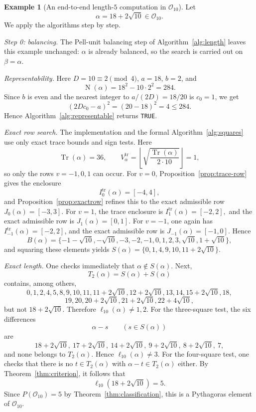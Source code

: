 \documentclass[manuscript,screen]{acmart}
\renewcommand{\le}{\leqslant}
\theoremstyle{plain}
\theoremstyle{definition}
\newtheorem{example}[theorem]{Example}
\theoremstyle{nonitalicremark}
\newcommand{\OO}{\mathcal{O}}
\newcommand{\len}{\ell}
\newcommand{\Tr}{\operatorname{Tr}}
\newcommand{\Norm}{\operatorname{N}}
\begin{document}
\begin{example}[An end-to-end length-$5$ computation in $\OO_{10}$]\label{ex:endtoend}
Let
\[
\alpha = 18 + 2\sqrt{10} \in \OO_{10}.
\]
We apply the algorithms step by step.

\noindent\emph{Step 0: balancing.} The Pell-unit balancing step of Algorithm~\ref{alg:length} leaves this example unchanged: $\alpha$ is already balanced, so the search is carried out on $\beta=\alpha$.

\noindent\emph{Representability.}
Here $D=10\equiv 2 \pmod 4$, $a=18$, $b=2$, and
\[
\Norm(\alpha)=18^2-10\cdot 2^2 = 284.
\]
Since $b$ is even and the nearest integer to $a/(2D)=18/20$ is $c_0=1$, we get
\[
(2Dc_0-a)^2 = (20-18)^2 = 4 \le 284.
\]
Hence Algorithm~\ref{alg:representable} returns \texttt{TRUE}.

\noindent\emph{Exact row search.}
The implementation and the formal Algorithm~\ref{alg:squares} use only exact trace bounds and
sign tests. Here
\[
\Tr(\alpha)=36,
\qquad
V_\alpha^{\mathrm{tr}}=\left\lfloor\sqrt{\frac{\Tr(\alpha)}{2\cdot 10}}\right\rfloor=1,
\]
so only the rows $v=-1,0,1$ can occur.
For $v=0$, Proposition~\ref{prop:trace-row} gives the enclosure
\[
I^{\mathrm{tr}}_0(\alpha)=[-4,4],
\]
and Proposition~\ref{prop:exactrow} refines this to the exact admissible row
\(
J_0(\alpha)=[-3,3].
\)
For $v=1$, the trace enclosure is
\(
I^{\mathrm{tr}}_1(\alpha)=[-2,2],
\)
and the exact admissible row is
\(
J_1(\alpha)=[0,1].
\)
For $v=-1$, one again has $I^{\mathrm{tr}}_{-1}(\alpha)=[-2,2]$, and the exact admissible row is
\(
J_{-1}(\alpha)=[-1,0].
\)
Hence
\[
B(\alpha)=\{-1-\sqrt{10},-\sqrt{10},-3,-2,-1,0,1,2,3,\sqrt{10},1+\sqrt{10}\},
\]
and squaring these elements yields
\(
S(\alpha)=\{0,1,4,9,10,11+2\sqrt{10}\}.
\)

\noindent\emph{Exact length.}
One checks immediately that $\alpha\notin S(\alpha)$. Next,
\[
T_2(\alpha)=S(\alpha)+S(\alpha)
\]
contains, among others,
\[
0,1,2,4,5,8,9,10,11,11+2\sqrt{10},12+2\sqrt{10},13,14,15+2\sqrt{10},18,
\]
\[
19,20,20+2\sqrt{10},21+2\sqrt{10},22+4\sqrt{10},
\]
but not $18+2\sqrt{10}$. Therefore $\len_{10}(\alpha)\neq 1,2$.
For the three-square test, the six differences
\[
\alpha-s \qquad (s\in S(\alpha))
\]
are
\[
18+2\sqrt{10},\ 17+2\sqrt{10},\ 14+2\sqrt{10},\ 9+2\sqrt{10},\ 8+2\sqrt{10},\ 7,
\]
and none belongs to $T_2(\alpha)$. Hence $\len_{10}(\alpha)\neq 3$.
For the four-square test, one checks that there is no $t\in T_2(\alpha)$ with
$\alpha-t\in T_2(\alpha)$ either. By Theorem~\ref{thm:criterion}, it follows that
\[
\len_{10}(18+2\sqrt{10}) = 5.
\]
Since $P(\OO_{10})=5$ by Theorem~\ref{thm:classification}, this is a Pythagoras element of
$\OO_{10}$.
\end{example}
\end{document}
